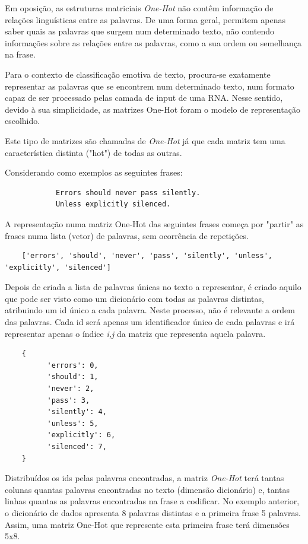 Em oposição, as estruturas matriciais \textit{One-Hot} não contêm informação de relações linguísticas entre as palavras. 
De uma forma geral, permitem apenas saber quais as palavras que surgem num determinado texto, não contendo informações sobre as relações entre as palavras, como a sua ordem ou semelhança na frase.

Para o contexto de classificação emotiva de texto, procura-se exatamente representar as palavras que se encontrem num determinado texto, num formato capaz de ser processado pelas camada de input de uma RNA. Nesse sentido, devido à sua simplicidade, as matrizes One-Hot foram o modelo de representação escolhido. 

Este tipo de matrizes são chamadas de \textit{One-Hot} já que cada matriz tem uma característica distinta ("hot") de todas as outras.

Considerando como exemplos as seguintes frases:
\begin{verbatim}
            Errors should never pass silently.
            Unless explicitly silenced.
\end{verbatim}

A representação numa matriz One-Hot das seguintes frases começa por "partir" as frases numa lista (vetor) de palavras, sem ocorrência de repetições. 

\begin{verbatim}
    ['errors', 'should', 'never', 'pass', 'silently', 'unless', 'explicitly', 'silenced']
\end{verbatim}

Depois de criada a lista de palavras únicas no texto a representar, é criado aquilo que pode ser visto como um dicionário com todas as palavras distintas, atribuindo um id único a cada palavra. Neste processo, não é relevante a ordem das palavras. Cada id será apenas um identificador único de cada palavras e irá representar apenas o índice \textit{i,j} da matriz que representa aquela palavra.

\begin{verbatim}
    {
          'errors': 0,      
          'should': 1,
          'never': 2,
          'pass': 3,
          'silently': 4,
          'unless': 5,
          'explicitly': 6,
          'silenced': 7,
    }
\end{verbatim}

Distribuídos os ids pelas palavras encontradas, a matriz \textit{One-Hot} terá tantas colunas quantas palavras encontradas no texto (dimensão dicionário) e, tantas linhas quantas as palavras encontradas na frase a codificar. 
No exemplo anterior, o dicionário de dados apresenta 8 palavras distintas e a primeira frase 5 palavras. Assim, uma matriz One-Hot que represente esta primeira frase terá dimensões 5x8. 

